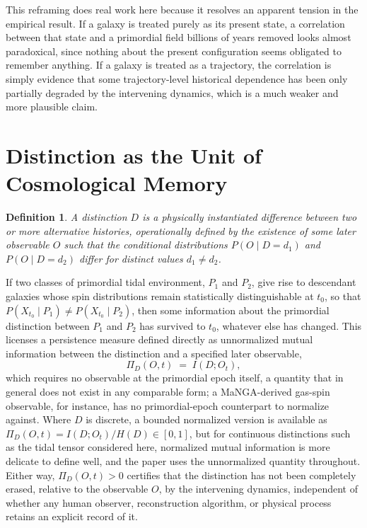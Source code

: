 \documentclass[11pt]{article}
\newtheorem{definition}{Definition}
\begin{document}
This reframing does real work here because it resolves an apparent tension in the empirical result. If a galaxy is treated purely as its present state, a correlation between that state and a primordial field billions of years removed looks almost paradoxical, since nothing about the present configuration seems obligated to remember anything. If a galaxy is treated as a trajectory, the correlation is simply evidence that some trajectory-level historical dependence has been only partially degraded by the intervening dynamics, which is a much weaker and more plausible claim.

\section{Distinction as the Unit of Cosmological Memory}

\begin{definition}
A distinction $D$ is a physically instantiated difference between two or more alternative histories, operationally defined by the existence of some later observable $O$ such that the conditional distributions $P(O \mid D = d_1)$ and $P(O \mid D = d_2)$ differ for distinct values $d_1 \neq d_2$.
\end{definition}

If two classes of primordial tidal environment, $P_1$ and $P_2$, give rise to descendant galaxies whose spin distributions remain statistically distinguishable at $t_0$, so that $P(X_{t_0} \mid P_1) \neq P(X_{t_0} \mid P_2)$, then some information about the primordial distinction between $P_1$ and $P_2$ has survived to $t_0$, whatever else has changed. This licenses a persistence measure defined directly as unnormalized mutual information between the distinction and a specified later observable,
\begin{equation}
\Pi_D(O, t) \;=\; I(D; O_t),
\end{equation}
which requires no observable at the primordial epoch itself, a quantity that in general does not exist in any comparable form; a MaNGA-derived gas-spin observable, for instance, has no primordial-epoch counterpart to normalize against. Where $D$ is discrete, a bounded normalized version is available as $\Pi_D(O, t) = I(D; O_t) / H(D) \in [0,1]$, but for continuous distinctions such as the tidal tensor considered here, normalized mutual information is more delicate to define well, and the paper uses the unnormalized quantity throughout. Either way, $\Pi_D(O,t) > 0$ certifies that the distinction has not been completely erased, relative to the observable $O$, by the intervening dynamics, independent of whether any human observer, reconstruction algorithm, or physical process retains an explicit record of it.
\end{document}
